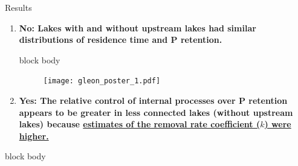 \documentclass[final,hyperref={pdfpagelabels=false}]{beamer}
\begin{document}
\begin{frame}[t]
\begin{columns}[t]
\begin{column}{.465\textwidth}
% 
% 
% 

\vspace{0.5em}

\begin{block}{Results}
\begin{enumerate}
\item \textbf{No: Lakes with and without upstream lakes had similar distributions of residence time and P retention.}

\vspace{0.5em}

{
\begin{beamercolorbox}[wd=\textwidth,rounded=true]{block body}

\begin{figure}
  \texttt{[image: gleon\_poster\_1.pdf]}
\end{figure}

\end{beamercolorbox}
}

\vspace{0.5em}

\item \textbf{Yes: The relative control of internal processes over P retention appears to be greater in less connected lakes (without upstream lakes) because \ul{estimates of the removal rate coefficient ($k$) were higher.}}
\end{enumerate}

\vspace{0.5em}

{
\begin{beamercolorbox}[wd=\textwidth,rounded=true]{block body}


\end{beamercolorbox}}
\end{block}
\end{column}
\end{columns}
\end{frame}
\end{document}
